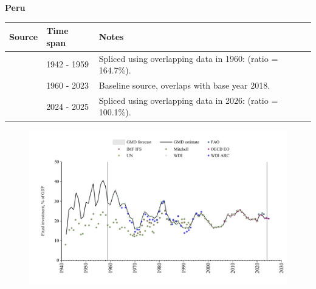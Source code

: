 \documentclass[12pt,a4paper,landscape]{article}
\begin{document}
\begin{adjustbox}{max totalsize={\paperwidth}{\paperheight},center}
\begin{minipage}[t][\textheight][t]{\textwidth}
\vspace*{0.5cm}
{}
\begin{center}
{\Large\bfseries Peru}
\end{center}
\vspace{0.5cm}
\begin{table}[H]
\centering
\small
\begin{tabular}{|l|l|l|}
\hline
\textbf{Source} & \textbf{Time span} & \textbf{Notes} \\
\hline
\rowcolor{white}\cite{Mitchell}& 1942 - 1959 &Spliced using overlapping data in 1960: (ratio = 164.7\%).\\
\rowcolor{lightgray}\cite{WDI}& 1960 - 2023 &Baseline source, overlaps with base year 2018.\\
\rowcolor{white}\cite{OECD_EO}& 2024 - 2025 &Spliced using overlapping data in 2026: (ratio = 100.1\%).\\
\hline
\end{tabular}
\end{table}
\begin{figure}[H]
\centering
\includegraphics[width=\textwidth,height=0.6\textheight,keepaspectratio]{graphs/PER_finv_GDP.pdf}
\end{figure}
\end{minipage}
\end{adjustbox}
\end{document}

